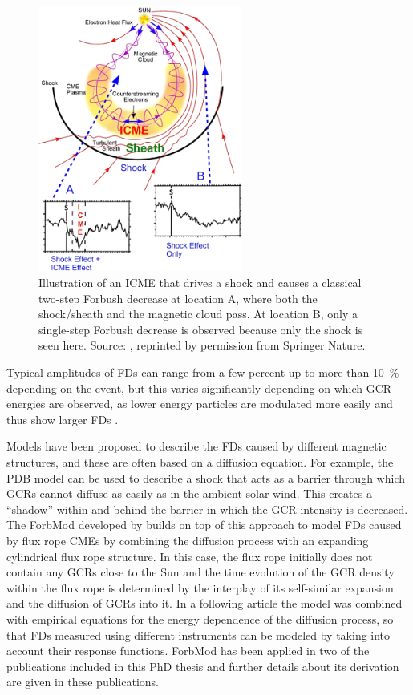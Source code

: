 \begin{figure}
	\centering
	\includegraphics[width=0.6\textwidth]{images/richardson_cane_2011_icme.png}
	\caption{Illustration of an ICME that drives a shock and causes a classical two-step Forbush decrease at location A, where both the shock/sheath and the magnetic cloud pass. At location B, only a single-step Forbush decrease is observed because only the shock is seen here. Source: \citet[Figure 1]{Richardson-Cane-2011}, reprinted by permission from Springer Nature.}
	\label{fig:richardsoncane-cme}
\end{figure}
Typical amplitudes of \acp{FD} can range from a few percent up to more than \SI{10}{\percent} depending on the event, but this varies significantly depending on which \ac{GCR} energies are observed, as lower energy particles are modulated more easily and thus show larger \acp{FD} \citep[e.g.][]{Lockwood1971,Lockwood1991}.

Models have been proposed to describe the \acp{FD} caused by different magnetic structures, and these are often based on a diffusion equation. For example, the \acl{PDB} model \citep[\acs{PDB},][]{Wibberenz-1998} can be used to describe a shock that acts as a barrier through which \acp{GCR} cannot diffuse as easily as in the ambient solar wind. This creates a ``shadow'' within and behind the barrier in which the \ac{GCR} intensity is decreased.
The \ac{ForbMod} developed by \citet{Dumbovic2018-ForbMod} builds on top of this approach to model \acp{FD} caused by flux rope \acp{CME} by combining the diffusion process with an expanding cylindrical flux rope structure. In this case, the flux rope initially does not contain any \acp{GCR} close to the Sun and the time evolution of the \ac{GCR} density within the flux rope is determined by the interplay of its self-similar expansion and the diffusion of \acp{GCR} into it. In a following article \citep{Dumbovic-2020-ForbMod} the model was combined with empirical equations for the energy dependence of the diffusion process, so that \acp{FD} measured using different instruments can be modeled by taking into account their response functions. \ac{ForbMod} has been applied in two of the publications included in this PhD thesis \citep{Forstner-2020,Forstner-2021-SolO} and further details about its derivation are given in these publications.

